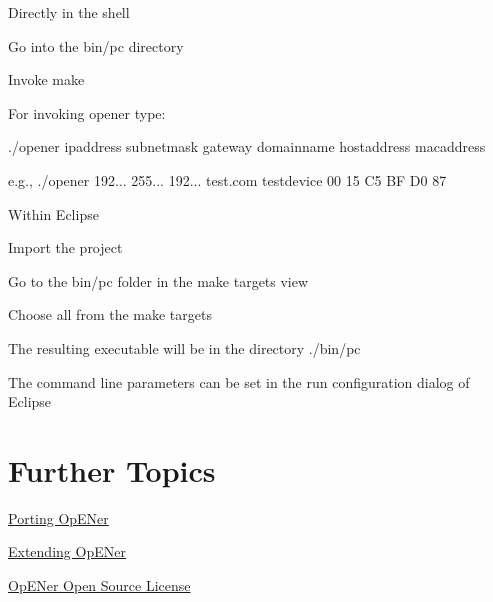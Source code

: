 \begin{DoxyEnumerate}
\item \-Directly in the shell
\begin{DoxyEnumerate}
\item \-Go into the bin/pc directory
\item \-Invoke make
\item \-For invoking opener type\-:\par
 ./opener ipaddress subnetmask gateway domainname hostaddress macaddress\par
 e.\-g., ./opener 192... 255... 192... test.\-com testdevice 00 15 \-C5 \-B\-F \-D0 87
\end{DoxyEnumerate}
\item \-Within \-Eclipse
\begin{DoxyEnumerate}
\item \-Import the project
\item \-Go to the bin/pc folder in the make targets view
\item \-Choose all from the make targets
\item \-The resulting executable will be in the directory ./bin/pc
\item \-The command line parameters can be set in the run configuration dialog of \-Eclipse
\end{DoxyEnumerate}
\end{DoxyEnumerate}\hypertarget{index_further_reading_sec}{}\section{\-Further Topics}\label{index_further_reading_sec}

\begin{DoxyItemize}
\item \hyperlink{porting}{\-Porting \-Op\-E\-Ner}
\item \hyperlink{extending}{\-Extending \-Op\-E\-Ner}
\item \hyperlink{license}{\-Op\-E\-Ner \-Open \-Source \-License} 
\end{DoxyItemize}